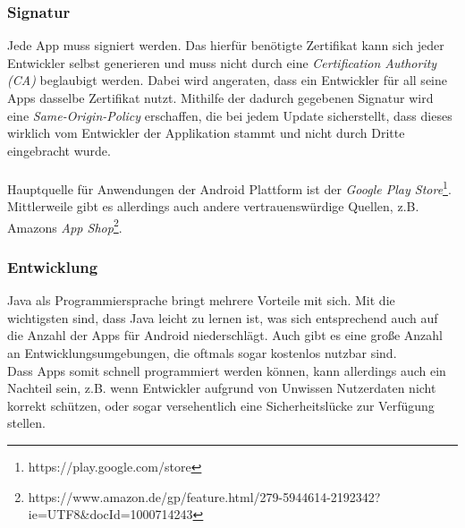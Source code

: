 	\subsubsection{Signatur}
	Jede App muss signiert werden. Das hierfür benötigte Zertifikat kann sich jeder Entwickler selbst generieren und muss nicht durch eine \textit{Certification Authority (CA)} beglaubigt werden. Dabei wird angeraten, dass ein Entwickler für all seine Apps dasselbe Zertifikat nutzt. Mithilfe der dadurch gegebenen Signatur wird eine \textit{Same-Origin-Policy} erschaffen, die bei jedem Update sicherstellt, dass dieses wirklich vom Entwickler der Applikation stammt und nicht durch Dritte eingebracht wurde.\\\\
	Hauptquelle für Anwendungen der Android Plattform ist der \textit{Google Play Store}\footnote{https://play.google.com/store}. Mittlerweile gibt es allerdings auch andere vertrauenswürdige Quellen, z.B. Amazons \textit{App Shop}\footnote{https://www.amazon.de/gp/feature.html/279-5944614-2192342?ie=UTF8\&docId=1000714243}.
	
	\subsubsection{Entwicklung}
	Java als Programmiersprache bringt mehrere Vorteile mit sich. Mit die wichtigsten sind, dass Java leicht zu lernen ist, was sich entsprechend auch auf die Anzahl der Apps für Android niederschlägt. Auch gibt es eine große Anzahl an Entwicklungsumgebungen, die oftmals sogar kostenlos nutzbar sind.\\
	Dass Apps somit schnell programmiert werden können, kann allerdings auch ein Nachteil sein, z.B. wenn Entwickler aufgrund von Unwissen Nutzerdaten nicht korrekt schützen, oder sogar versehentlich eine Sicherheitslücke zur Verfügung stellen.